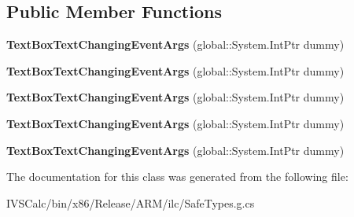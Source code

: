 \subsection*{Public Member Functions}
\begin{DoxyCompactItemize}
\item 
\mbox{\label{class_windows_1_1_u_i_1_1_xaml_1_1_controls_1_1_text_box_text_changing_event_args_ab833ff777fa6832783ca0c92246b1b25}} 
{\bfseries Text\+Box\+Text\+Changing\+Event\+Args} (global\+::\+System.\+Int\+Ptr dummy)
\item 
\mbox{\label{class_windows_1_1_u_i_1_1_xaml_1_1_controls_1_1_text_box_text_changing_event_args_ab833ff777fa6832783ca0c92246b1b25}} 
{\bfseries Text\+Box\+Text\+Changing\+Event\+Args} (global\+::\+System.\+Int\+Ptr dummy)
\item 
\mbox{\label{class_windows_1_1_u_i_1_1_xaml_1_1_controls_1_1_text_box_text_changing_event_args_ab833ff777fa6832783ca0c92246b1b25}} 
{\bfseries Text\+Box\+Text\+Changing\+Event\+Args} (global\+::\+System.\+Int\+Ptr dummy)
\item 
\mbox{\label{class_windows_1_1_u_i_1_1_xaml_1_1_controls_1_1_text_box_text_changing_event_args_ab833ff777fa6832783ca0c92246b1b25}} 
{\bfseries Text\+Box\+Text\+Changing\+Event\+Args} (global\+::\+System.\+Int\+Ptr dummy)
\item 
\mbox{\label{class_windows_1_1_u_i_1_1_xaml_1_1_controls_1_1_text_box_text_changing_event_args_ab833ff777fa6832783ca0c92246b1b25}} 
{\bfseries Text\+Box\+Text\+Changing\+Event\+Args} (global\+::\+System.\+Int\+Ptr dummy)
\end{DoxyCompactItemize}


The documentation for this class was generated from the following file\+:\begin{DoxyCompactItemize}
\item 
I\+V\+S\+Calc/bin/x86/\+Release/\+A\+R\+M/ilc/Safe\+Types.\+g.\+cs\end{DoxyCompactItemize}

